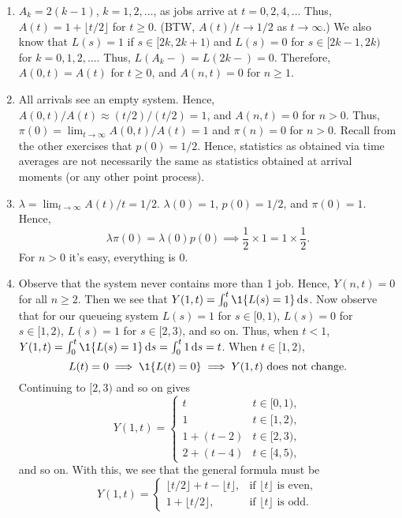 \documentclass[stochastic-or.tex]{subfiles}
\begin{document}
\begin{exercise}
\begin{solution}
\begin{enumerate}
\item $A_{k} = 2(k-1)$, $k=1, 2, \ldots$, as jobs arrive at $t=0, 2, 4, \ldots$ Thus, $A(t) = 1 + \lfloor t/2 \rfloor$ for $t \geq 0$.
(BTW, $A(t)/t \to 1/2$ as $t\to \infty$.)
We also know that $L(s)=1$ if $s\in [2k, 2k+1)$ and $L(s)=0$ for $s\in[2k-1, 2k)$ for $k=0, 1, 2, \ldots$.
Thus, $L(A_k-) = L(2k-)=0$.
Therefore, $A(0,t) = A(t)$ for $t \geq 0$, and $A(n,t)=0$ for $n\geq 1$.
\item All arrivals see an empty system.
  Hence, $A(0,t)/A(t) \approx (t/2)/(t/2) = 1$, and $A(n,t)=0$ for $n>0$.
  Thus, $\pi(0) = \lim_{t\to\infty} A(0,t)/A(t) = 1$ and $\pi(n)=0$ for $n>0$.
  Recall from the other exercises that $p(0)=1/2$.
  Hence, statistics as obtained via time averages are not necessarily the same as statistics obtained at arrival moments (or any other point process).
  \item $\lambda = \lim_{t\to\infty} A(t)/t = 1/2$. $\lambda(0)=1$, $p(0)=1/2$, and $\pi(0)=1$. Hence,
\begin{equation*}
 \lambda \pi(0) = \lambda(0) p(0) \implies \frac 1 2 \times 1 = 1\times \frac 1 2.
\end{equation*}
For $n>0$ it's easy, everything is 0.
\item
Observe that the system never contains
 more than 1 job. Hence, $Y(n,t)=0$ for all $n\geq 2$. Then we see that
 $Y(1,t) = \int_0^t \1{\L(s) = 1}\d s$. Now observe that for our
 queueing system $L(s)=1$ for $s\in[0,1)$, $L(s)=0$ for
 $s\in[1,2)$, $L(s)=1$ for $s\in[2,3)$, and so on. Thus, when
 $t<1$, $Y(1,t)=\int_0^t \1{\L(s)=1} \d s = \int_0^t 1\d s = t$.
 When $t\in[1,2)$,
 \begin{equation*}
 L(t)=0 \implies \1{\L(t)=0} \implies Y(1,t) \text{ does not change}.
 \end{equation*}
Continuing to $[2,3)$ and so on gives
 \begin{equation*}
 Y(1,t) =
 \begin{cases}
 t & t\in[0,1), \\
 1 & t\in[1,2), \\
 1+(t-2) & t\in[2,3), \\
 2+(t-4) & t\in[4,5),
 \end{cases}
 \end{equation*}
 and so on. With this, we see that the general formula must be
 \begin{equation*}
Y(1, t) =
 \begin{cases}
 \lfloor t/2\rfloor +   t-\lfloor t \rfloor, &\text{if } \lfloor t \rfloor \text{ is even}, \\
1+ \lfloor t/2\rfloor, &\text{if } \lfloor t \rfloor \text{ is odd}.
 \end{cases}
 \end{equation*}


\end{enumerate}
\end{solution}
\end{exercise}
\end{document}
